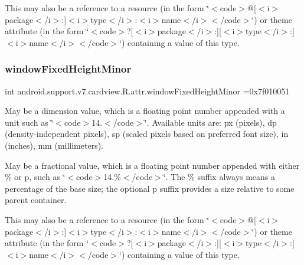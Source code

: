This may also be a reference to a resource (in the form \char`\"{}$<$code$>$@\mbox{[}$<$i$>$package$<$/i$>$\+:\mbox{]}$<$i$>$type$<$/i$>$\+:$<$i$>$name$<$/i$>$$<$/code$>$\char`\"{}) or theme attribute (in the form \char`\"{}$<$code$>$?\mbox{[}$<$i$>$package$<$/i$>$\+:\mbox{]}\mbox{[}$<$i$>$type$<$/i$>$\+:\mbox{]}$<$i$>$name$<$/i$>$$<$/code$>$\char`\"{}) containing a value of this type. \mbox{\label{classandroid_1_1support_1_1v7_1_1cardview_1_1R_1_1attr_a60bf3e2e51947cdc537b53c40f25c529}} 
\subsubsection{\texorpdfstring{window\+Fixed\+Height\+Minor}{windowFixedHeightMinor}}
{\footnotesize\ttfamily int android.\+support.\+v7.\+cardview.\+R.\+attr.\+window\+Fixed\+Height\+Minor =0x7f010051\hspace{0.3cm}{\ttfamily [static]}}

May be a dimension value, which is a floating point number appended with a unit such as \char`\"{}$<$code$>$14.\+5sp$<$/code$>$\char`\"{}. Available units are\+: px (pixels), dp (density-\/independent pixels), sp (scaled pixels based on preferred font size), in (inches), mm (millimeters). 

May be a fractional value, which is a floating point number appended with either \% or p, such as \char`\"{}$<$code$>$14.\%$<$/code$>$\char`\"{}. The \% suffix always means a percentage of the base size; the optional p suffix provides a size relative to some parent container. 

This may also be a reference to a resource (in the form \char`\"{}$<$code$>$@\mbox{[}$<$i$>$package$<$/i$>$\+:\mbox{]}$<$i$>$type$<$/i$>$\+:$<$i$>$name$<$/i$>$$<$/code$>$\char`\"{}) or theme attribute (in the form \char`\"{}$<$code$>$?\mbox{[}$<$i$>$package$<$/i$>$\+:\mbox{]}\mbox{[}$<$i$>$type$<$/i$>$\+:\mbox{]}$<$i$>$name$<$/i$>$$<$/code$>$\char`\"{}) containing a value of this type. \mbox{\label{classandroid_1_1support_1_1v7_1_1cardview_1_1R_1_1attr_a6cdacbf4e2a2cbb70fdaf3d3a002e710}} 
